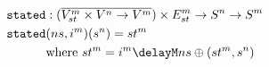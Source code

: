 \documentclass[preview]{standalone}
\begin{document}
\begin{align*}
  \texttt{stated} &: (\wrapdf{V^m_{st} \times V^n \rightarrow V^m}) \times E^m_{st} \rightarrow S^n \rightarrow S^m \\
  \texttt{stated} &(ns,i^m)(s^n) = st^m \\
                 &\text{where}\ st^m = i^m \delayM ns \oplus (st^m, s^n) 
\end{align*}
\end{document}
